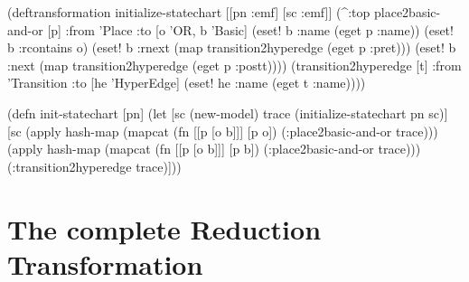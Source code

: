 \documentclass[submission]{eptcs}
\begin{document}
\begin{clojurecode}
(deftransformation initialize-statechart [[pn :emf] [sc :emf]]
  (^:top place2basic-and-or [p]
         :from 'Place
         :to [o 'OR, b 'Basic]
         (eset! b :name (eget p :name))
         (eset! b :rcontains o)
         (eset! b :rnext (map transition2hyperedge (eget p :pret)))
         (eset! b :next  (map transition2hyperedge (eget p :postt))))
  (transition2hyperedge [t]
         :from 'Transition
         :to [he 'HyperEdge]
         (eset! he :name (eget t :name))))

(defn init-statechart [pn]
  (let [sc (new-model)
        trace (initialize-statechart pn sc)]
    [sc
     (apply hash-map (mapcat (fn [[p [o b]]] [p o])
                             (:place2basic-and-or trace)))
     (apply hash-map (mapcat (fn [[p [o b]]] [p b])
                             (:place2basic-and-or trace)))
     (:transition2hyperedge trace)]))
\end{clojurecode}

\section{The complete Reduction Transformation}
\label{sec:reduction-code}
\end{document}
